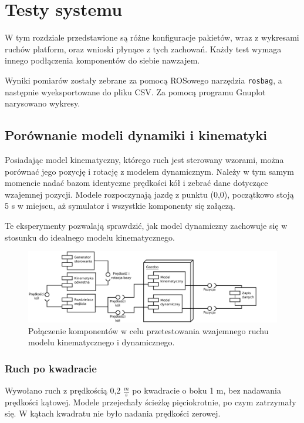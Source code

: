\chapter{Testy systemu}
\label{sec:tests}
W tym rozdziale przedstawione są różne konfiguracje pakietów, wraz z wykresami ruchów platform, oraz wnioski płynące z tych zachowań.
Każdy test wymaga innego podłączenia komponentów do siebie nawzajem.

Wyniki pomiarów zostały zebrane za pomocą ROSowego narzędzia \texttt{rosbag}, a następnie wyeksportowane do pliku CSV. Za pomocą programu Gnuplot narysowano wykresy.

\section{Porównanie modeli dynamiki i kinematyki}
	Posiadając model kinematyczny, którego ruch jest sterowany wzorami, można porównać jego pozycję i rotację z modelem dynamicznym.
	Należy w tym samym momencie nadać bazom identyczne prędkości kół i zebrać dane dotyczące wzajemnej pozycji.
	Modele rozpoczynają jazdę z punktu (0,0), początkowo stoją 5 s w miejscu, aż symulator i wszystkie komponenty się załączą.
	
	Te eksperymenty pozwalają sprawdzić, jak model dynamiczny zachowuje się w stosunku do idealnego modelu kinematycznego.
	
	\begin{figure}[H]
		\centering
		\includegraphics[width=\textwidth]{uml/gramofon.pdf}
			\caption{Połączenie komponentów w celu przetestowania wzajemnego ruchu modelu kinematycznego i dynamicznego.}
		\label{uml:gramofon}
	\end{figure}
	
	\subsection{Ruch po kwadracie}
		\label{sec:test_square}
		Wywołano ruch z prędkością 0,2 $\frac{m}{s}$ po kwadracie o boku 1 m, bez nadawania prędkości kątowej.
		Modele przejechały ścieżkę pięciokrotnie, po czym zatrzymały się. W kątach kwadratu nie było nadania prędkości zerowej.
		
